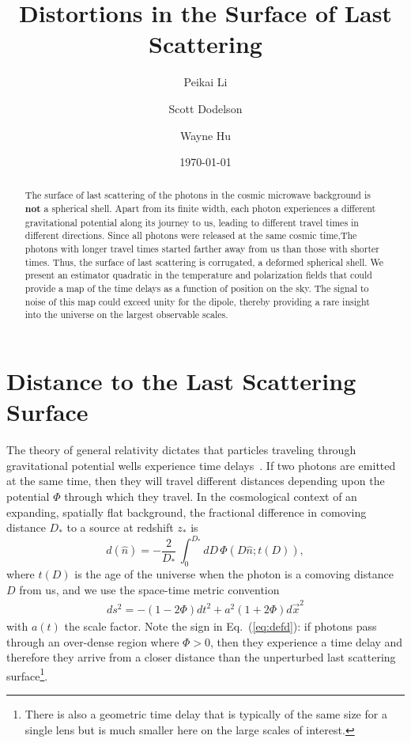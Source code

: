 \documentclass[prd,amsmath,amssymb,floatfix,superscriptaddress,nofootinbib,twocolumn]{revtex4-1}
\def\be{\begin{equation}}
\def\ee{\end{equation}}
\def\bea{\begin{eqnarray}}
\def\eea{\end{eqnarray}}
\newcommand{\ec}[1]{Eq.~(\ref{eq:#1})}
\newcommand{\eql}[1]{\label{eq:#1}}
\newcommand{\prvs}[1]{{\color{magenta} #1}}
\begin{document}
\title{Distortions in the Surface of Last Scattering}


\author{\large Peikai Li}
\author{\large Scott Dodelson}
\author{\large Wayne Hu}

\date{\today}

\begin{abstract}
The surface of last scattering of the photons in the cosmic microwave background is {\bf not} a spherical shell. Apart from its finite width, each photon experiences a different gravitational potential along its journey to us, leading to different travel times in different directions. \prvs{Since all photons were released at the same cosmic time,}The photons with longer travel times started farther away from us than those with shorter times. Thus, the surface of last scattering is corrugated, a deformed spherical shell. We present an estimator quadratic in the temperature and polarization fields that could provide a map of the time delays as a function of position on the sky. The signal to noise of this map could exceed unity for the dipole, thereby providing a rare insight into the universe on the largest observable scales.
\end{abstract}

\maketitle

\section{Distance to the Last Scattering Surface}
\newcommand\fd{d}

The theory of general relativity dictates that particles traveling through gravitational potential wells experience time delays~\cite{1964PhRvL..13..789S}. If two photons are emitted at the same time, then they will travel different distances depending upon the potential $\Phi$ through which they travel. In the cosmological context of an expanding,  spatially flat background, the 
fractional difference in comoving distance
$D_*$ to a source at redshift $z_*$ is 
\be
d(\hat n) =- \frac{2}{D_*}\, \int_0^{D_*} dD\, \Phi\left(D \hat n; t(D)\right)\eql{defd},
\ee
where 
$t(D)$ is the age of the universe when the photon is a comoving distance $D$ from us, and  we use the space-time metric convention 
\bea
ds^{2}= -(1-2\Phi)dt^{2}+a^{2}(1+2\Phi)d\vec{x}^{2}
\eea
with $a(t)$ the scale factor.
Note the sign in \ec{defd}: if photons pass through an over-dense region where $\Phi>0$, then they experience a time delay and therefore they arrive from a closer distance than the unperturbed last scattering surface\footnote{There is also a geometric time delay that is typically of the same size for a single lens but is much smaller here on the large scales of interest.}. 
\end{document}
